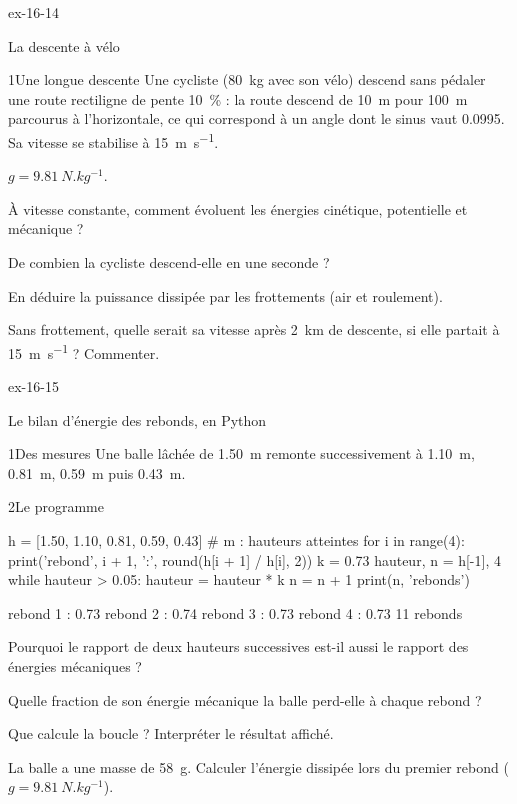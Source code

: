 \begin{blocLivre}{ex-16-14}
\begin{exercice}[3]{La descente à vélo}
\begin{docu}{1}{Une longue descente}
Une cycliste (\qty{80}{kg} avec son vélo) descend sans pédaler une route rectiligne de pente \qty{10}{\percent} : la route descend de \qty{10}{m} pour \qty{100}{m}
parcourus à l'horizontale, ce qui correspond à un angle dont le sinus vaut \num{0,0995}. Sa vitesse se stabilise à \qty{15}{m.s^{-1}}.
\end{docu}
\begin{donnees}
$g=\qty{9,81}{N.kg^{-1}}$.
\end{donnees}
\begin{questions}
\item À vitesse constante, comment évoluent les énergies cinétique, potentielle et mécanique ?
\item De combien la cycliste descend-elle en une seconde ?
\item \initiative En déduire la puissance dissipée par les frottements (air et roulement).
\item Sans frottement, quelle serait sa vitesse après \qty{2}{km} de descente, si elle partait à \qty{15}{m.s^{-1}} ? Commenter.
\end{questions}
\end{exercice}
\end{blocLivre}
\begin{blocLivre}{ex-16-15}
\begin{exercice}[3]{Le bilan d'énergie des rebonds, en Python}
\begin{docu}{1}{Des mesures}
Une balle lâchée de \qty{1,50}{m} remonte successivement à \qty{1,10}{m}, \qty{0,81}{m}, \qty{0,59}{m} puis \qty{0,43}{m}.
\end{docu}
\begin{docu}{2}{Le programme}
\begin{python}
h = [1.50, 1.10, 0.81, 0.59, 0.43]          # m : hauteurs atteintes
for i in range(4):
    print('rebond', i + 1, ':', round(h[i + 1] / h[i], 2))
k = 0.73
hauteur, n = h[-1], 4
while hauteur > 0.05:
    hauteur = hauteur * k
    n = n + 1
print(n, 'rebonds')
\end{python}
\begin{console}
rebond 1 : 0.73
rebond 2 : 0.74
rebond 3 : 0.73
rebond 4 : 0.73
11 rebonds
\end{console}
\end{docu}
\begin{questions}
\item {}Pourquoi le rapport de deux hauteurs successives est-il aussi le rapport des énergies mécaniques ?
\item Quelle fraction de son énergie mécanique la balle perd-elle à chaque rebond ?
\item Que calcule la boucle  ? Interpréter le résultat affiché.
\item \initiative La balle a une masse de \qty{58}{g}. Calculer l'énergie dissipée lors du premier rebond ($g=\qty{9,81}{N.kg^{-1}}$).
\end{questions}
\end{exercice}
\end{blocLivre}
